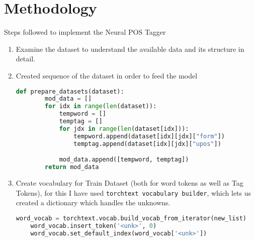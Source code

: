 
\section{Methodology}

Steps followed to implement the Neural POS Tagger

\begin{enumerate}
	\item Examine the dataset to understand the available data and its structure in detail.
	\item Created sequence of the dataset in order to feed the model
	\begin{lstlisting}[language=Python]
	def prepare_datasets(dataset):
    	mod_data = []
   		for idx in range(len(dataset)):
       		tempword = []
       		temptag = []
       		for jdx in range(len(dataset[idx])):
           		tempword.append(dataset[idx][jdx]["form"])
           		temptag.append(dataset[idx][jdx]["upos"])

        	mod_data.append([tempword, temptag])
    	return mod_data
	\end{lstlisting}
	
	\item Create vocabulary for Train Dataset (both for word tokens as well as Tag Tokens), for this I have used \texttt{torchtext vocabulary builder}, which lets us created a dictionary which handles the unknowns.
	\begin{lstlisting}[language=Python]
	word_vocab = torchtext.vocab.build_vocab_from_iterator(new_list)
	word_vocab.insert_token('<unk>', 0)            
	word_vocab.set_default_index(word_vocab['<unk>'])
	\end{lstlisting}


\end{enumerate}
